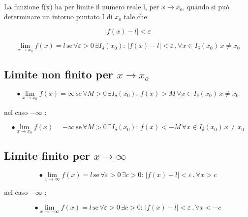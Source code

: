 \documentclass[a4paper,11pt]{article}
\begin{document}
La funzione f(x) ha per limite il numero reale l, per \( x \to x_o \), quando si può determinare un intorno puntato I  di \( x_o \) tale che 


\begin{center}
    \[ 
    \vert f(x) - l\vert < \varepsilon
    \]
\end{center}




\begin{center}
    \[
    \lim_{x \to x_0} f(x) = l \, 
    \text{se} \, 
    \forall \varepsilon > 0 \, \exists I_{\delta} (x_0) : \, 
    \vert f(x) - l \vert < \varepsilon \, ,
    \forall x \in I_{\delta} (x_0) \, 
    x \neq x_0
    \]
\end{center}

\subsection{Limite non finito per \( x \to x_o \)}


\begin{center}
    \[ \bullet
    \lim_{x \to x_0} f(x) = \infty \, 
    \text{se} \, 
    \forall M > 0  \, \exists I_{\delta} (x_0) : \, 
    f(x) > M \, 
    \forall x \in I_{\delta} (x_0) \, 
    x \neq x_0
    \]

\end{center}

nel caso \( - \infty \) :
\begin{center}
    \[ \bullet
    \lim_{x \to x_0} f(x) = - \infty \, 
    \text{se} \, 
    \forall M > 0 \, \exists I_{\delta} (x_0) : \, 
    f(x) < -M \, 
    \forall x \in I_{\delta} (x_0) \, 
    x \neq x_0
    \]

\end{center}

\subsection{Limite finito per \( x \to \infty \) }

\begin{center}
    \[ \bullet
    \lim_{x \to \infty} f(x) = l \, 
    \text{se} \, 
    \forall \varepsilon > 0 \, \exists c > 0 : \, 
    \vert f(x) - l \vert < \varepsilon \, ,
    \forall x > c
    \]

\end{center}

nel caso \( - \infty \) :

\begin{center}
    \[ \bullet
    \lim_{x \to - \infty} f(x) = l \, 
    \text{se} \, 
    \forall \varepsilon > 0 \, \exists c > 0 : \, 
    \vert f(x) - l \vert < \varepsilon \, ,
    \forall x < -c
    \]

\end{center}
\end{document}

